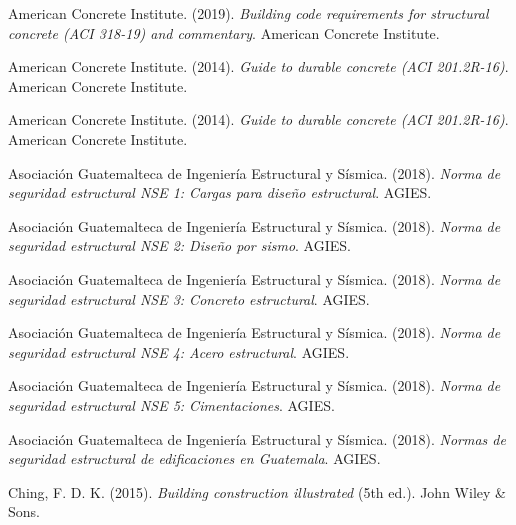 \documentclass[14pt,letterpaper]{extarticle}
\begin{document}
	
	\newpage
	
	\renewcommand{\refname}{Referencias}
	
	
	
	
	\renewcommand{\refname}{Referencias}
	
		 American Concrete Institute. (2019). \textit{Building code requirements for structural concrete (ACI 318-19) and commentary}. American Concrete Institute.
		
	
		 American Concrete Institute. (2014). \textit{Guide to durable concrete (ACI 201.2R-16)}. American Concrete Institute.
	

		
	
		
		American Concrete Institute. (2014). \textit{Guide to durable concrete (ACI 201.2R-16)}. American Concrete Institute.
		
		Asociación Guatemalteca de Ingeniería Estructural y Sísmica. (2018). \textit{Norma de seguridad estructural NSE 1: Cargas para diseño estructural}. AGIES.
		
		 Asociación Guatemalteca de Ingeniería Estructural y Sísmica. (2018). \textit{Norma de seguridad estructural NSE 2: Diseño por sismo}. AGIES.
		
		 Asociación Guatemalteca de Ingeniería Estructural y Sísmica. (2018). \textit{Norma de seguridad estructural NSE 3: Concreto estructural}. AGIES.
		
		 Asociación Guatemalteca de Ingeniería Estructural y Sísmica. (2018). \textit{Norma de seguridad estructural NSE 4: Acero estructural}. AGIES.
		
		 Asociación Guatemalteca de Ingeniería Estructural y Sísmica. (2018). \textit{Norma de seguridad estructural NSE 5: Cimentaciones}. AGIES.
		
		 Asociación Guatemalteca de Ingeniería Estructural y Sísmica. (2018). \textit{Normas de seguridad estructural de edificaciones en Guatemala}. AGIES.
		
		Ching, F. D. K. (2015). \textit{Building construction illustrated} (5th ed.). John Wiley \& Sons.
		
	
	
	
\end{document}
